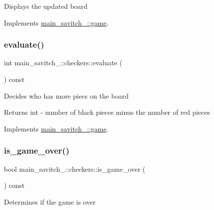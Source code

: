 Displays the updated board 

Implements \hyperlink{classmain__savitch__14_1_1game}{main\+\_\+savitch\+\_\+::game}.

\mbox{\label{classmain__savitch__14_1_1checkers_a1705b4e1bfe04205ebb7703925b50f9f}} 
\subsubsection{\texorpdfstring{evaluate()}{evaluate()}}
{\footnotesize\ttfamily int main\+\_\+savitch\+\_\+::checkers\+::evaluate (\begin{DoxyParamCaption}{ }\end{DoxyParamCaption}) const\hspace{0.3cm}{\ttfamily [virtual]}}

Decides who has more piecs on the board \begin{DoxyReturn}{Returns}
int -\/ number of black pieces minus the number of red pieces 
\end{DoxyReturn}


Implements \hyperlink{classmain__savitch__14_1_1game}{main\+\_\+savitch\+\_\+::game}.

\mbox{\label{classmain__savitch__14_1_1checkers_ab8481b1a443f4b190d3ff508ab6f62a7}} 
\subsubsection{\texorpdfstring{is\+\_\+game\+\_\+over()}{is\_game\_over()}}
{\footnotesize\ttfamily bool main\+\_\+savitch\+\_\+::checkers\+::is\+\_\+game\+\_\+over (\begin{DoxyParamCaption}{ }\end{DoxyParamCaption}) const\hspace{0.3cm}{\ttfamily [virtual]}}

Determines if the game is over

